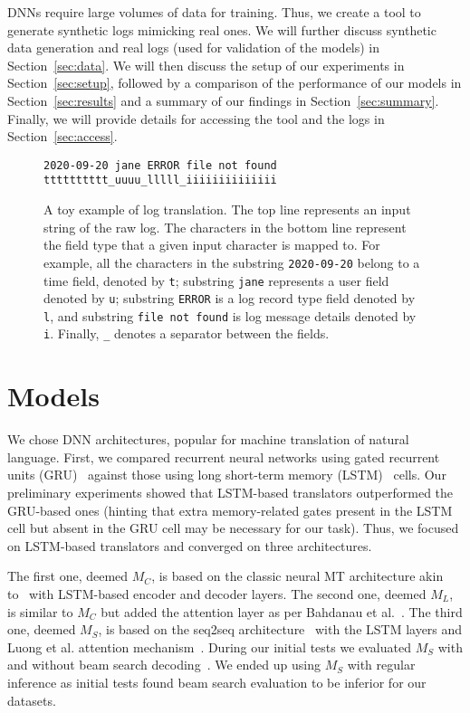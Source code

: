 \documentclass{article}
\begin{document}
DNNs require large volumes of data for training. Thus, we create a tool to generate synthetic logs mimicking real ones. We will further discuss synthetic data generation and real logs (used for validation of the models) in Section~\ref{sec:data}. 
We will then discuss the setup of our experiments in Section~\ref{sec:setup}, followed by a comparison of the performance of our models in Section~\ref{sec:results} and a summary of our findings in Section~\ref{sec:summary}. Finally, we will provide details for accessing the tool and the logs in Section~\ref{sec:access}.


\begin{figure}[bt]
    \centering
    \begin{framed}
    \small
    \texttt{2020-09-20 jane ERROR file not found} \\
    \texttt{tttttttttt\_uuuu\_lllll\_iiiiiiiiiiiiii} 
    \end{framed}
    \caption{A toy example of log translation. The top line represents an input string of the raw log. The characters in the bottom line represent the field type that a given input character is mapped to. For example, all the characters in the substring \texttt{2020-09-20} belong to a time field, denoted by \texttt{t}; substring \texttt{jane} represents a user field denoted by \texttt{u};  substring \texttt{ERROR} is a log record type field denoted by \texttt{l}, and  substring \texttt{file not found} is log message details denoted by \texttt{i}. Finally, \texttt{\_} denotes a separator between the fields. }
    \label{fig:toy}
\end{figure}

\section{Models} \label{sec:models}
We chose DNN architectures, popular for machine translation of natural language. First, we compared recurrent neural networks using gated recurrent units  (GRU)~\cite{DBLP:conf/emnlp/ChoMGBBSB14} against those using long short-term memory (LSTM)~\cite{DBLP:journals/neco/HochreiterS97} cells. Our preliminary experiments showed that LSTM-based translators outperformed the GRU-based ones (hinting that extra memory-related gates present in the LSTM cell but absent in the GRU cell may be necessary for our task). Thus, we focused on LSTM-based translators and converged on three architectures. 

The first one, deemed $M_C$, is based on the classic neural MT architecture akin to~\cite{DBLP:conf/nips/SutskeverVL14} with LSTM-based encoder and decoder layers. The second one, deemed $M_L$, is similar to $M_C$ but added the attention layer as per Bahdanau et al.~\cite{DBLP:journals/corr/BahdanauCB14}. The third one, deemed $M_S$, is based on the seq2seq architecture~\cite{DBLP:journals/corr/BritzGLL17} with the LSTM layers and  Luong et al. attention mechanism~\cite{DBLP:conf/emnlp/LuongPM15}. During our initial tests we evaluated $M_S$ with and without beam search decoding~\cite{DBLP:journals/corr/WuSCLNMKCGMKSJL16}. We ended up using $M_S$ with regular inference as initial tests found beam search evaluation to be inferior for our datasets.
\end{document}
